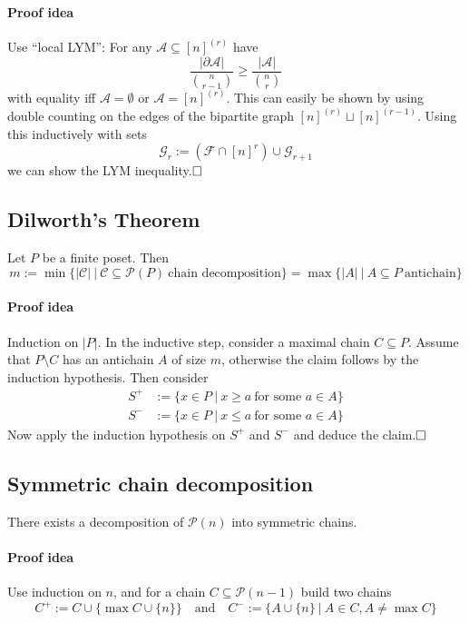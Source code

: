 \documentclass{scrartcl}
\begin{document}
\paragraph{Proof idea} Use ``local LYM'': For any $\mathcal{A} \subseteq [n]^{(r)}$ have
\begin{equation*}
    \frac {|\partial\mathcal{A}|} {{n \choose r - 1}} \geq \frac {|\mathcal{A}|} {{n \choose r}}
\end{equation*}
with equality iff $\mathcal{A} = \emptyset$ or $\mathcal{A} = [n]^{(r)}$.
This can easily be shown by using double counting on the edges of the bipartite graph $[n]^{(r)} \sqcup [n]^{(r - 1)}$.
Using this inductively with sets
\begin{equation*}
    \mathcal{G}_r := \left(\mathcal{F} \cap [n]^{r}\right) \cup \mathcal{G}_{r + 1}
\end{equation*}
we can show the LYM inequality.$\hfill\square$

\subsection{Dilworth's Theorem}
Let $P$ be a finite poset. Then
\begin{equation*}
    m := \min \{ |\mathcal{C}| \ | \ \mathcal{C} \subseteq \mathcal{P}(P) \ \text{chain decomposition} \} = \max \{ |A| \ | \ A \subseteq P \ \text{antichain} \}
\end{equation*}
\paragraph{Proof idea} Induction on $|P|$. 
In the inductive step, consider a maximal chain $C \subseteq P$.
Assume that $P \setminus C$ has an antichain $A$ of size $m$, otherwise the claim follows by the induction hypothesis.
Then consider
\begin{align*}
    S^+ &:= \{ x \in P \ | \ x \geq a \ \text{for some $a \in A$}\} \\
    S^- &:= \{ x \in P \ | \ x \leq a \ \text{for some $a \in A$}\}
\end{align*}
Now apply the induction hypothesis on $S^+$ and $S^-$ and deduce the claim.$\hfill\square$

\subsection{Symmetric chain decomposition}
There exists a decomposition of $\mathcal{P}(n)$ into symmetric chains.
\paragraph{Proof idea} Use induction on $n$, and for a chain $C \subseteq \mathcal{P}(n - 1)$ build two chains
\begin{equation*}
    C^+ := C \cup \{ \max C \cup \{ n \} \} \quad \text{and} \quad C^- := \{ A \cup \{n\} \ | \ A \in C, A \neq \max C \}
\end{equation*}
\end{document}
